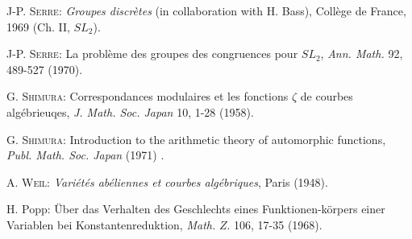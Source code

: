 \begin{thebibliography}{99}
 \textsc{J-P. Serre:} \textit{Groupes discr\`etes} (in collaboration with H. Bass), Coll\`ege de France, 1969 (Ch. II, $SL_2$).

 \textsc{J-P. Serre:} La probl\`eme des groupes des congruences pour  $SL_2$, \textit{Ann. Math.} 92, 489-527 (1970).

 \textsc{G. Shimura:} Correspondances modulaires et les fonctions $\zeta$ de courbes alg\'ebrieuqes, \textit{J. Math. Soc. Japan} 10, 1-28 (1958).

 \textsc{G. Shimura:} Introduction to the arithmetic theory of automorphic functions, \textit{Publ. Math. Soc. Japan} (1971) .

 \textsc{A. Weil:} \textit{Vari\'et\'es ab\'eliennes et courbes alg\'ebriques}, Paris (1948).

 H. Popp: \"Uber das Verhalten des Geschlechts eines Funktionen-k\"orpers einer Variablen bei Konstantenreduktion, \textit{Math.} $Z$. 106, 17-35 (1968).
\end{thebibliography}
